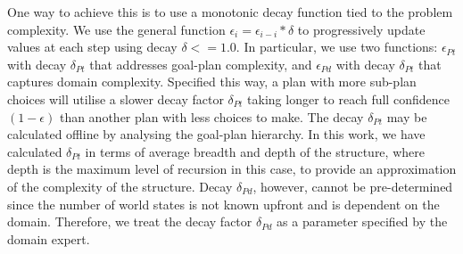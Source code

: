 %
%
%
%
%


%
One way to achieve this is to use a monotonic decay function tied to the problem complexity. We use the general function $\epsilon_i = \epsilon_{i-i} * \delta$ to progressively update values at each step using decay $\delta <= 1.0$. In particular, we use two functions: $\epsilon_{Pt}$ with decay $\delta_{Pt}$ that addresses goal-plan complexity, and $\epsilon_{Pd}$ with decay $\delta_{Pt}$ that captures domain complexity.
%
Specified this way, a plan with more sub-plan choices will utilise a slower decay factor $\delta_{Pt}$ taking longer to reach full confidence $(1-\epsilon)$ than another plan with less choices to make. 
%
The decay $\delta_{Pt}$ may be calculated offline by analysing the goal-plan hierarchy. In this work, we have calculated $\delta_{Pt}$ in terms of average breadth and depth of the structure, where depth is the maximum level of recursion in this case, to provide an approximation of the complexity of the structure.
%
Decay $\delta_{Pd}$, however, cannot be pre-determined since the number of world states is not known upfront and is dependent on the domain. 
%
Therefore, we treat the decay factor $\delta_{Pd}$ as a parameter specified by the domain expert.
